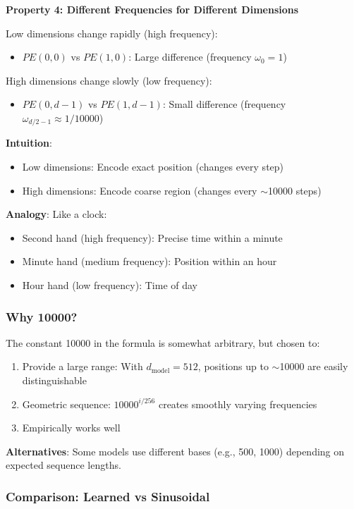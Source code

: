 \textbf{Property 4: Different Frequencies for Different Dimensions}

Low dimensions change rapidly (high frequency):
\begin{itemize}
\item $PE(0, 0)$ vs $PE(1, 0)$: Large difference (frequency $\omega_0 = 1$)
\end{itemize}

High dimensions change slowly (low frequency):
\begin{itemize}
\item $PE(0, d-1)$ vs $PE(1, d-1)$: Small difference (frequency $\omega_{d/2-1} \approx 1/10000$)
\end{itemize}

\textbf{Intuition}:
\begin{itemize}
\item Low dimensions: Encode exact position (changes every step)
\item High dimensions: Encode coarse region (changes every $\sim$10000 steps)
\end{itemize}

\textbf{Analogy}: Like a clock:
\begin{itemize}
\item Second hand (high frequency): Precise time within a minute
\item Minute hand (medium frequency): Position within an hour
\item Hour hand (low frequency): Time of day
\end{itemize}

\subsubsection{Why 10000?}

The constant 10000 in the formula is somewhat arbitrary, but chosen to:
\begin{enumerate}
\item Provide a large range: With $d_{\text{model}} = 512$, positions up to $\sim$10000 are easily distinguishable
\item Geometric sequence: $10000^{i/256}$ creates smoothly varying frequencies
\item Empirically works well
\end{enumerate}

\textbf{Alternatives}: Some models use different bases (e.g., 500, 1000) depending on expected sequence lengths.

\subsubsection{Comparison: Learned vs Sinusoidal}

